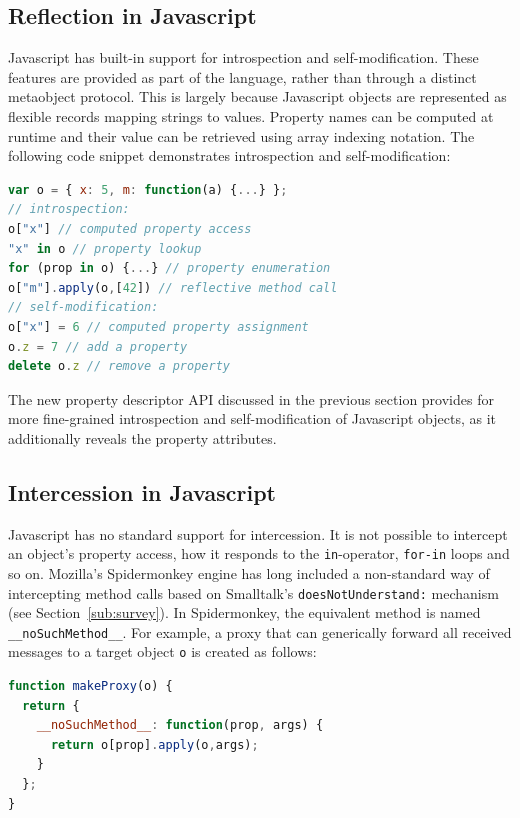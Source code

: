 \documentclass{sig-alternate}
\newcommand{\noSuchMethod}{\texttt{\_\_noSuchMethod\_\_}}
\begin{document}
\subsection{Reflection in Javascript}
\label{sub:introspection_in_js}

Javascript has built-in support for introspection and self-modification. These features are provided as part of the language, rather than through a distinct metaobject protocol. This is largely because Javascript objects are represented as flexible records mapping strings to values. Property names can be computed at runtime and their value can be retrieved using array indexing notation. The following code snippet demonstrates introspection and self-modification:

\begin{lstlisting}[language=javascript]
var o = { x: 5, m: function(a) {...} };
// introspection:
o["x"] // computed property access
"x" in o // property lookup
for (prop in o) {...} // property enumeration
o["m"].apply(o,[42]) // reflective method call
// self-modification:
o["x"] = 6 // computed property assignment
o.z = 7 // add a property
delete o.z // remove a property
\end{lstlisting}

The new property descriptor API discussed in the previous section provides for more fine-grained introspection and self-modification of Javascript objects, as it additionally reveals the property attributes.

\subsection{Intercession in Javascript}
\label{sub:intercession_in_javascript}

Javascript has no standard support for intercession. It is not possible to intercept an object's property access, how it responds to the \texttt{in}-operator, \texttt{for-in} loops and so on. Mozilla's Spidermonkey engine has long included a non-standard way of intercepting method calls based on Smalltalk's \texttt{doesNotUnderstand:} mechanism (see Section~\ref{sub:survey}). In Spidermonkey, the equivalent method is named \noSuchMethod{}. For example, a proxy that can generically forward all received messages to a target object \texttt{o} is created as follows:

\begin{lstlisting}[language=javascript]
function makeProxy(o) {
  return {
    __noSuchMethod__: function(prop, args) {
      return o[prop].apply(o,args);
    }
  };
}
\end{lstlisting}
\end{document}
